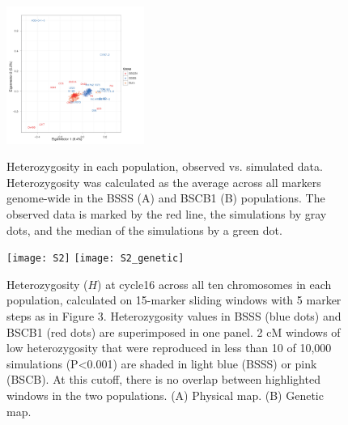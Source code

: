 \begin{figure}[tb]   
  \begin{center}
   \vspace{-0mm}
   \includegraphics[width=0.4\textwidth]{FigS1}
   \renewcommand{\baselinestretch}{0.9}
   \vspace{-3mm}
   \caption{Heterozygosity in each population, observed vs. simulated data. Heterozygosity was calculated as the average across all markers genome-wide  in the BSSS (A)  and BSCB1 (B) populations. The observed data is marked by the red line, the simulations by gray dots, and the median of the simulations by a green dot. } 
\vspace{-6mm}
    \label{fig:s1}
  \end{center}
\end{figure}

\begin{figure}[tb]   
  \begin{center}
   \vspace{-0mm}
   \texttt{[image: S2]}
\texttt{[image: S2\_genetic]}
   \renewcommand{\baselinestretch}{0.9}
   \vspace{-3mm}
   \caption{Heterozygosity ($H$) at cycle16 across all ten chromosomes in each population, calculated on 15-marker sliding windows with 5 marker steps as in Figure 3. Heterozygosity values in BSSS (blue dots) and BSCB1 (red dots) are superimposed in one panel. 2 cM windows of low heterozygosity that were reproduced in less than 10 of 10,000 simulations (P<0.001) are shaded in light blue (BSSS) or pink (BSCB). At this cutoff, there is no overlap between highlighted windows in the two populations. (A) Physical map. (B) Genetic map. } 
\vspace{-6mm}
    \label{fig:s1}
  \end{center}
\end{figure}

\newpage

